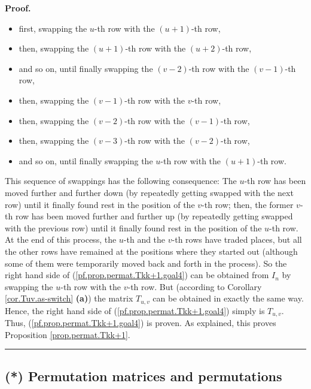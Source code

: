 \documentclass[numbers=enddot,12pt,final,onecolumn,notitlepage]{scrartcl}%
\theoremstyle{definition}
\newenvironment{proof}[1][Proof]{\noindent\textbf{#1.} }{\ \rule{0.5em}{0.5em}}
\begin{document}
\begin{proof}
\begin{itemize}
\item first, swapping the $u$-th row with the $\left(  u+1\right)  $-th row,

\item then, swapping the $\left(  u+1\right)  $-th row with the $\left(
u+2\right)  $-th row,

\item and so on, until finally swapping the $\left(  v-2\right)  $-th row with
the $\left(  v-1\right)  $-th row,

\item then, swapping the $\left(  v-1\right)  $-th row with the $v$-th row,

\item then, swapping the $\left(  v-2\right)  $-th row with the $\left(
v-1\right)  $-th row,

\item then, swapping the $\left(  v-3\right)  $-th row with the $\left(
v-2\right)  $-th row,

\item and so on, until finally swapping the $u$-th row with the $\left(
u+1\right)  $-th row.
\end{itemize}

This sequence of swappings has the following consequence: The $u$-th row has
been moved further and further down (by repeatedly getting swapped with the
next row) until it finally found rest in the position of the $v$-th row; then,
the former $v$-th row has been moved further and further up (by repeatedly
getting swapped with the previous row) until it finally found rest in the
position of the $u$-th row. At the end of this process, the $u$-th and the
$v$-th rows have traded places, but all the other rows have remained at the
positions where they started out (although some of them were temporarily moved
back and forth in the process). So the right hand side of
(\ref{pf.prop.permat.Tkk+1.goal4}) can be obtained from $I_{n}$ by swapping
the $u$-th row with the $v$-th row. But (according to Corollary
\ref{cor.Tuv.as-switch} \textbf{(a)}) the matrix $T_{u,v}$ can be obtained in
exactly the same way. Hence, the right hand side of
(\ref{pf.prop.permat.Tkk+1.goal4}) simply is $T_{u,v}$. Thus,
(\ref{pf.prop.permat.Tkk+1.goal4}) is proven. As explained, this proves
Proposition \ref{prop.permat.Tkk+1}.
\end{proof}

\subsection{\label{sect.gauss.permat.perms}(*) Permutation matrices and
permutations}
\end{document}
